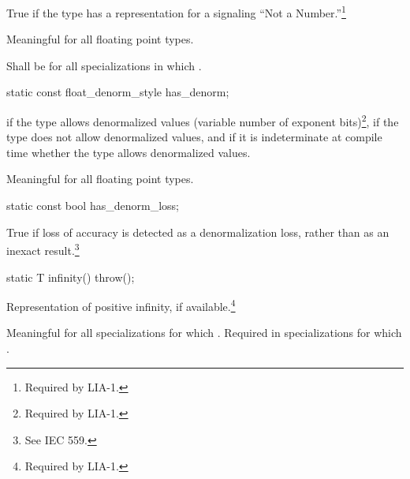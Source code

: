 \begin{itemdescr}
\pnum
True if the type has a representation for a signaling ``Not a Number.''\footnote{Required by LIA-1.}

\pnum
Meaningful for all floating point types.

\pnum
Shall be
for all specializations in which
.
\end{itemdescr}

\begin{itemdecl}
static const float_denorm_style has_denorm;
\end{itemdecl}

\begin{itemdescr}
\pnum
{}
if the type allows denormalized values
(variable number of exponent bits)\footnote{Required by LIA-1.},
if the type does not allow denormalized values,
and
if it is indeterminate at compile time whether the type allows
denormalized values.

\pnum
Meaningful for all floating point types.
\end{itemdescr}

\begin{itemdecl}
static const bool has_denorm_loss;
\end{itemdecl}

\begin{itemdescr}
\pnum
True if loss of accuracy is detected as a
denormalization loss, rather than as an inexact result.\footnote{See IEC 559.}
\end{itemdescr}

\begin{itemdecl}
static T infinity() throw();
\end{itemdecl}

\begin{itemdescr}
\pnum
Representation of positive infinity, if available.\footnote{Required by LIA-1.}

\pnum
Meaningful for all specializations for which
.
Required in specializations for which
.
\end{itemdescr}

